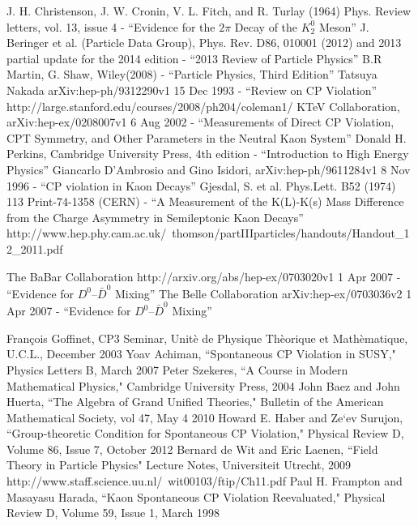 \documentclass[floatfix,aps,prd,amsmath,amssymb]{revtex4}
\begin{document}
\begin{thebibliography}{10}
J. H. Christenson, J. W. Cronin, V. L. Fitch, and R. Turlay (1964) Phys. Review letters, vol. 13, issue 4 - ``Evidence for the $2 \pi$ Decay of the $K^0_2$ Meson'' 
J. Beringer et al. (Particle Data Group), Phys. Rev. D86, 010001 (2012) and 2013 partial update for the 2014 edition - ``2013 Review of Particle Physics'' 
B.R Martin, G. Shaw, Wiley(2008) - ``Particle Physics, Third Edition'' 
Tatsuya Nakada arXiv:hep-ph/9312290v1 15 Dec 1993 - ``Review on CP Violation''
http://large.stanford.edu/courses/2008/ph204/coleman1/  
KTeV Collaboration, arXiv:hep-ex/0208007v1 6 Aug 2002 - ``Measurements of Direct CP Violation, CPT Symmetry, and Other Parameters in the Neutral Kaon System'' 
Donald H. Perkins, Cambridge University Press, 4th edition - ``Introduction to High Energy Physics'' 
Giancarlo D’Ambrosio and Gino Isidori, arXiv:hep-ph/9611284v1 8 Nov 1996 - ``CP violation in Kaon Decays'' 
Gjesdal, S. et al. Phys.Lett. B52 (1974) 113 Print-74-1358 (CERN) - ``A Measurement of the K(L)-K(s) Mass Difference from the Charge Asymmetry in Semileptonic Kaon Decays'' 
http://www.hep.phy.cam.ac.uk/~thomson/partIIIparticles/handouts/Handout\_12\_2011.pdf

The BaBar Collaboration http://arxiv.org/abs/hep-ex/0703020v1 1 Apr 2007 - ``Evidence for $D^{0}–\bar{D}^{0}$ Mixing''
The Belle Collaboration arXiv:hep-ex/0703036v2 1 Apr 2007 - ``Evidence for $D^{0}–\bar{D}^{0}$ Mixing''

Fran\c{c}ois Goffinet, CP3 Seminar, Unit\`{e} de Physique Th\`{e}orique et Math\`{e}matique, U.C.L., December 2003
Yoav Achiman, ``Spontaneous CP Violation in SUSY," Physics Letters B, March 2007
Peter Szekeres, ``A Course in Modern Mathematical Physics," Cambridge University Press, 2004
John Baez and John Huerta, ``The Algebra of Grand Unified Theories," Bulletin of the American Mathematical Society, vol 47, May 4 2010
Howard E. Haber and Ze`ev Surujon, ``Group-theoretic Condition for Spontaneous CP Violation," Physical Review D, Volume 86, Issue 7, October 2012
Bernard de Wit and Eric Laenen, ``Field Theory in Particle Physics" Lecture Notes, Universiteit Utrecht, 2009 http://www.staff.science.uu.nl/~wit00103/ftip/Ch11.pdf
Paul H. Frampton and Masayasu Harada, ``Kaon Spontaneous CP Violation Reevaluated," Physical Review D, Volume 59, Issue 1, March 1998


\end{thebibliography}
\end{document}
